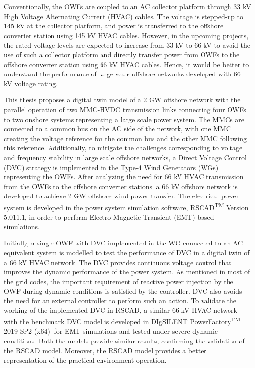 Conventionally, the OWFs are coupled to an AC collector platform through 33 kV High Voltage Alternating Current (HVAC) cables. The voltage is stepped-up to 145 kV at the collector platform, and power is transferred to the offshore converter station using 145 kV HVAC cables. However, in the upcoming projects, the rated voltage levels are expected to increase from 33 kV to 66 kV to avoid the use of such a collector platform and directly transfer power from OWFs to the offshore converter station using 66 kV HVAC cables. Hence, it would be better to understand the performance of large scale offshore networks developed with 66 kV voltage rating.   

This thesis proposes a digital twin model of a 2 GW offshore network with the parallel operation of two MMC-HVDC transmission links connecting four OWFs to two onshore systems representing a large scale power system. The MMCs are connected to a common bus on the AC side of the network, with one MMC creating the voltage reference for the common bus and the other MMC following this reference. Additionally, to mitigate the challenges corresponding to voltage and frequency stability in large scale offshore networks, a Direct Voltage Control (DVC) strategy is implemented in the Type-4 Wind Generators (WGs) representing the OWFs. After analyzing the need for 66 kV HVAC transmission from the OWFs to the offshore converter stations, a 66 kV offshore network is developed to achieve 2 GW offshore wind power transfer. The electrical power system is developed in the power system simulation software, RSCAD\textsuperscript{TM} Version 5.011.1, in order to perform Electro-Magnetic Transient (EMT) based simulations. 

Initially, a single OWF with DVC implemented in the WG connected to an AC equivalent system is modelled to test the performance of DVC in a digital twin of a 66 kV HVAC network. The DVC provides continuous voltage control that improves the dynamic performance of the power system. As mentioned in most of the grid codes, the important requirement of reactive power injection by the OWF during dynamic conditions is satisfied by the controller. DVC also avoids the need for an external controller to perform such an action. To validate the working of the implemented DVC in RSCAD, a similar 66 kV HVAC network with the benchmark DVC model is developed in DIgSILENT PowerFactory\textsuperscript{TM} 2019 SP2 (x64), for EMT simulations and tested under severe dynamic conditions. Both the models provide similar results, confirming the validation of the RSCAD model. Moreover, the RSCAD model provides a better representation of the practical environment operation. 


